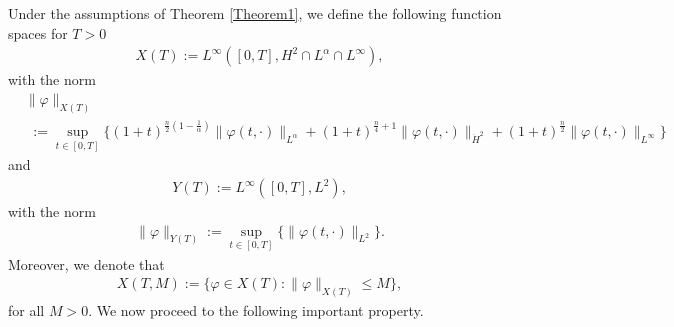 \documentclass[11pt,reqno]{amsart}
\begin{document}
Under the assumptions of Theorem \ref{Theorem1},  we define the following function spaces for $T>0$
\begin{align*}
    X(T) :=  L^{\infty}([0, T], H^2 \cap L^{\alpha} \cap L^{\infty}),
\end{align*}
with the norm
\begin{align*}
    &\|\varphi\|_{X(T)} \\
    &\,\,:= \sup _{t \in [0,T]} \bigg\{(1+t)^{\frac{n}{2}(1-\frac{1}{\alpha})}\|\varphi(t,\cdot)\|_{L^{\alpha}} + (1+t)^{\frac{n}{4}+1} \| \varphi(t,\cdot)\|_{\dot{H}^2} + (1+t)^{\frac{n}{2}} \|\varphi(t,\cdot)\|_{L^\infty} \bigg\}
\end{align*}
and 
\begin{align*}
    Y(T) := L^{\infty}([0,T], L^2),
\end{align*}
with the norm
\begin{align*}
    \|\varphi\|_{Y(T)} := \sup_{t \in [0,T]
    }\big\{\|\varphi(t,\cdot)\|_{L^2} \big\}.
\end{align*}
Moreover, we denote that 
\begin{align*}
    X(T, M) := \{\varphi \in X(T): \|\varphi\|_{X(T)} \leq M \},
\end{align*}
for all $M > 0$. We now proceed to the following important property.
\vspace{0.2cm}
\end{document}
